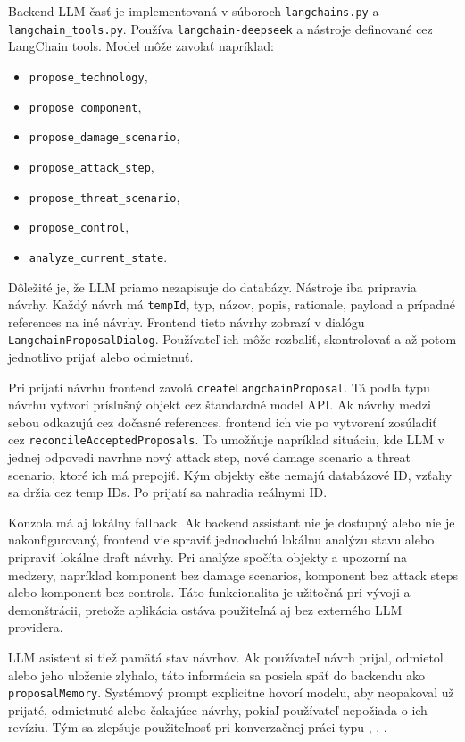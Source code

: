 \documentclass[11pt]{article}
\begin{document}
Backend LLM časť je implementovaná v súboroch \texttt{langchains.py} a \texttt{langchain\_tools.py}. Používa \texttt{langchain-deepseek} a nástroje definované cez LangChain tools. Model môže zavolať napríklad:

\begin{itemize}
    \item \texttt{propose\_technology},
    \item \texttt{propose\_component},
    \item \texttt{propose\_damage\_scenario},
    \item \texttt{propose\_attack\_step},
    \item \texttt{propose\_threat\_scenario},
    \item \texttt{propose\_control},
    \item \texttt{analyze\_current\_state}.
\end{itemize}

Dôležité je, že LLM priamo nezapisuje do databázy. Nástroje iba pripravia návrhy. Každý návrh má \texttt{tempId}, typ, názov, popis, rationale, payload a prípadné references na iné návrhy. Frontend tieto návrhy zobrazí v dialógu \texttt{LangchainProposalDialog}. Používateľ ich môže rozbaliť, skontrolovať a až potom jednotlivo prijať alebo odmietnuť.

Pri prijatí návrhu frontend zavolá \texttt{createLangchainProposal}. Tá podľa typu návrhu vytvorí príslušný objekt cez štandardné model API. Ak návrhy medzi sebou odkazujú cez dočasné references, frontend ich vie po vytvorení zosúladiť cez \texttt{reconcileAcceptedProposals}. To umožňuje napríklad situáciu, kde LLM v jednej odpovedi navrhne nový attack step, nové damage scenario a threat scenario, ktoré ich má prepojiť. Kým objekty ešte nemajú databázové ID, vzťahy sa držia cez temp IDs. Po prijatí sa nahradia reálnymi ID.

Konzola má aj lokálny fallback. Ak backend assistant nie je dostupný alebo nie je nakonfigurovaný, frontend vie spraviť jednoduchú lokálnu analýzu stavu alebo pripraviť lokálne draft návrhy. Pri analýze spočíta objekty a upozorní na medzery, napríklad komponent bez damage scenarios, komponent bez attack steps alebo komponent bez controls. Táto funkcionalita je užitočná pri vývoji a demonštrácii, pretože aplikácia ostáva použiteľná aj bez externého LLM providera.

LLM asistent si tiež pamätá stav návrhov. Ak používateľ návrh prijal, odmietol alebo jeho uloženie zlyhalo, táto informácia sa posiela späť do backendu ako \texttt{proposalMemory}. Systémový prompt explicitne hovorí modelu, aby neopakoval už prijaté, odmietnuté alebo čakajúce návrhy, pokiaľ používateľ nepožiada o ich revíziu. Tým sa zlepšuje použiteľnosť pri konverzačnej práci typu , , .
\end{document}
